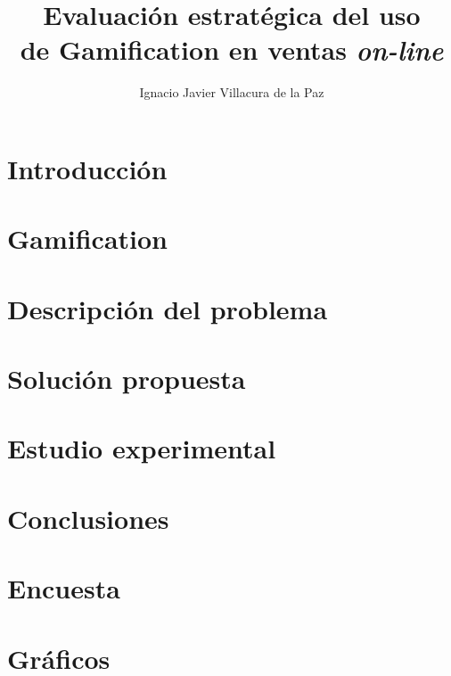 \documentclass[11pt,letterpaper]{report}
\begin{document}
\title{Evaluación estratégica del uso\\ de Gamification en ventas \emph{on-line}}
\author{Ignacio Javier Villacura de la Paz}
\ingciv
{}

\nolistoffigures
\nolistoftables
\beforepreface
  \listoftables
  \listoffigures



\afterpreface
\onehalfspacing

\chapter{Introducción}
\label{ch:introduccion}
    

\chapter{Gamification}
\label{ch:gamification}
    

\chapter{Descripción del problema}
\label{ch:desc}
    

\chapter{Solución propuesta}
\label{ch:solucion}
    

\chapter{Estudio experimental}
\label{ch:estudio}
    

\chapter{Conclusiones}
\label{ch:conclusiones}
    

\appendix
\chapter{Encuesta}
\label{ch:anexos}
    
\chapter{Gráficos}
\label{ch:anexos}
    


\singlespacing


\end{document}
